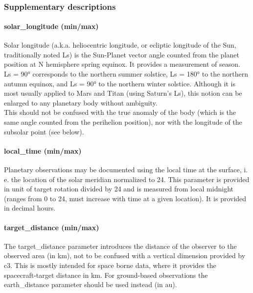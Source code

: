 \documentclass[11pt,a4paper]{ivoa}
\begin{document}
 

\subsubsection{Supplementary descriptions\\}

\paragraph{solar\_longitude (min/max)}

Solar longitude (a.k.a. heliocentric longitude, or ecliptic longitude of the Sun, traditionally noted Ls) is the Sun-Planet vector angle counted from the planet position at N hemisphere spring equinox. It provides a measurement of season. \\ Ls = 90° corresponds to the northern summer solstice, Ls = 180° to the northern autumn equinox, and Ls = 90° to the northern winter solstice. Although it is most usually applied to Mars and Titan (using Saturn's Ls), this notion can be enlarged to any planetary body without ambiguity.\\ This should not be confused with the true anomaly of the body (which is the same angle counted from the perihelion position), nor with the longitude of the subsolar point (see below).

\paragraph{local\_time (min/max)}

Planetary observations may be documented using the local time at the surface, i. e. the location of the solar meridian normalized to 24. This parameter is provided in unit of target rotation divided by 24 and is measured from local midnight (ranges from 0 to 24, must increase with time at a given location). It is provided in decimal hours.

\paragraph{target\_distance (min/max)}

The target\_distance parameter introduces the distance of the observer to the observed area (in km), not to be confused with a vertical dimension provided by c3. This is mostly intended for space borne data, where it provides the spacecraft-target distance in km. For ground-based observations the earth\_distance parameter should be used instead (in au).
\end{document}
